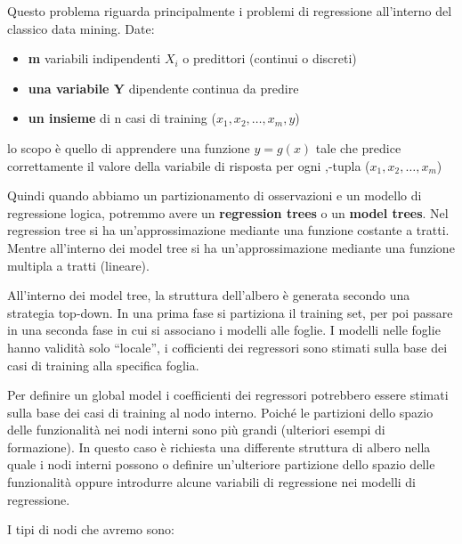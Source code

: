 \documentclass[a4paper]{extarticle}
\begin{document}
Questo problema riguarda principalmente i problemi di regressione all'interno del classico data mining. Date:

\begin{itemize}
\item \textbf{m} variabili indipendenti $X_i$ o predittori (continui o discreti)
\item \textbf{una variabile Y} dipendente continua da predire
\item \textbf{un insieme} di n casi di training ($x_1,x_2,\dots,x_m,y$)
\end{itemize}

lo scopo è quello di apprendere una funzione $y=g(x)$ tale che predice correttamente il valore della variabile di risposta per ogni ,-tupla ($x_1,x_2,\dots,x_m$)

Quindi quando abbiamo un partizionamento di osservazioni e un modello di regressione logica, potremmo avere un \textbf{regression trees} o un \textbf{model trees}.   Nel regression tree si ha un'approssimazione mediante una funzione costante a tratti. Mentre all'interno dei model tree si ha un'approssimazione mediante una funzione multipla a tratti (lineare).

All'interno dei model tree, la struttura dell'albero è generata secondo una strategia top-down. In una prima fase si partiziona il training set, per poi passare in una seconda fase in cui si associano i modelli alle foglie. I modelli nelle foglie hanno validità solo “locale”, i cofficienti dei regressori sono stimati sulla base dei casi di training alla specifica foglia.

Per definire un global model i coefficienti dei regressori potrebbero essere stimati sulla base dei casi di training al nodo interno. Poiché le partizioni dello spazio delle funzionalità nei nodi interni sono più grandi (ulteriori esempi di formazione). In questo caso è richiesta una differente struttura di albero nella quale i nodi interni possono o definire un'ulteriore partizione dello spazio delle funzionalità oppure introdurre alcune variabili di regressione nei modelli di regressione.

I tipi di nodi che avremo sono:
\end{document}
